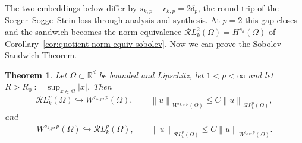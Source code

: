 \documentclass[12pt]{article}
\numberwithin{equation}{section}
\newtheorem{theorem}{Theorem}[section]
\numberwithin{figure}{section}
\numberwithin{equation}{section}
\newcommand{\R}{\mathbb{R}}
\newcommand{\norm}[1]{\left\|#1\right\|}
\begin{document}
The two embeddings below differ by $s_{k,p}-r_{k,p}=2\delta_p$, the round trip of
the Seeger--Sogge--Stein loss through analysis and synthesis. At $p=2$ this gap
closes and the sandwich becomes the norm equivalence
$\mathcal{R}L^2_k(\Omega)=H^{s_k}(\Omega)$ of
Corollary~\ref{cor:quotient-norm-equiv-sobolev}. Now we can prove the Sobolev Sandwich Theorem.
\begin{theorem}
\label{the:radon-lp-sobolev-embedding}
Let $\Omega\subset\R^d$ be bounded and Lipschitz, let $1<p<\infty$ and let
$R>R_0:=\sup_{x\in\Omega}|x|$. Then
\begin{align}
    \mathcal{R}L^p_k(\Omega)
    \hookrightarrow W^{r_{k,p},p}(\Omega),
    \qquad
    \norm{u}_{W^{r_{k,p},p}(\Omega)}
    \le C\norm{u}_{\mathcal{R}L^p_k(\Omega)},
    \label{eq:Bkp-to-basic-sobolev}
\end{align}
and
\begin{align}
    W^{s_{k,p},p}(\Omega)
    \hookrightarrow \mathcal{R}L^p_k(\Omega),
    \qquad
    \norm{u}_{\mathcal{R}L^p_k(\Omega)}
    \le C\norm{u}_{W^{s_{k,p},p}(\Omega)}.
    \label{eq:sobolev-to-Bkp}
\end{align}
\end{theorem}
\end{document}
